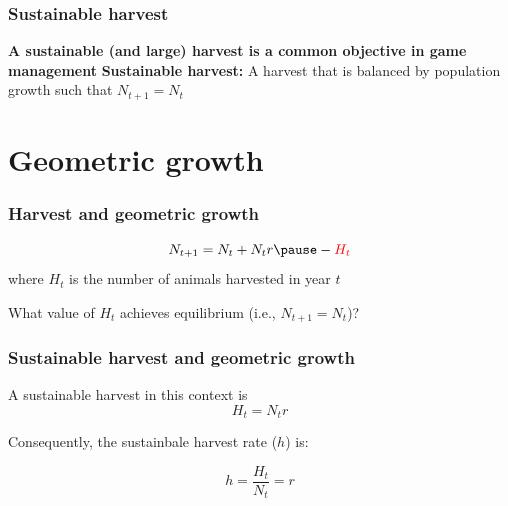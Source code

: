 \documentclass[color=usenames,dvipsnames]{beamer}\usepackage[]{graphicx}\usepackage[]{color}
\begin{document}










\begin{frame}
  \frametitle{Sustainable harvest}
  \Large
  {\bf A sustainable (and large) harvest is a common
    objective in game management}
  \vfill
  \pause
  {\bf Sustainable harvest:}
    A harvest that is balanced by population growth such that $N_{t+1}
    = N_t$
\end{frame}





\section{Geometric growth}




\begin{frame}
  \frametitle{Harvest and geometric growth}
  \Large
  \[
   N_{t+1} = N_t + N_tr \pause - \color{red}{H_t}
  \]
  \pause
  \vspace{1cm}
  \large
  where $H_t$ is the number of animals harvested in year $t$ \par
  \pause
  \vspace{2cm}
  What value of $H_t$ achieves equilibrium (i.e., $N_{t+1} = N_t$)?  \par
\end{frame}




\begin{frame}
  \frametitle{Sustainable harvest and geometric growth}
  \large
  A sustainable harvest in this context is
  \LARGE
  \[
    H_t = N_tr
  \]
  \pause
  \large
  \vfill
  {%
    Consequently, the sustainbale harvest rate ($h$) is: \par}
  \LARGE
  \[
    h = \frac{H_t}{N_t} = r
  \]
\end{frame}
\end{document}
